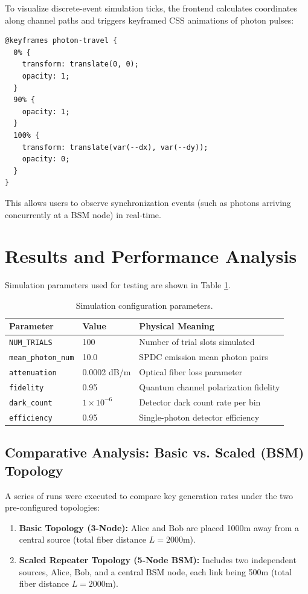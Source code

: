 \documentclass[12pt,oneside,letterpaper,english]{article}
\begin{document}
To visualize discrete-event simulation ticks, the frontend calculates coordinates along channel paths and triggers keyframed CSS animations of photon pulses:
\begin{lstlisting}[language=HTML, caption={CSS keyframe photon animation}, label={lst:css_anim}]
@keyframes photon-travel {
  0% {
    transform: translate(0, 0);
    opacity: 1;
  }
  90% {
    opacity: 1;
  }
  100% {
    transform: translate(var(--dx), var(--dy));
    opacity: 0;
  }
}
\end{lstlisting}
This allows users to observe synchronization events (such as photons arriving concurrently at a BSM node) in real-time.

\section{Results and Performance Analysis}

Simulation parameters used for testing are shown in Table \ref{tab:sim_params}.

\begin{table}[H]
\centering
\caption{Simulation configuration parameters.}
\label{tab:sim_params}
\begin{tabular}{lll}
\toprule
\textbf{Parameter} & \textbf{Value} & \textbf{Physical Meaning} \\
\midrule
\texttt{NUM\_TRIALS} & 100 & Number of trial slots simulated \\
\texttt{mean\_photon\_num} & 10.0 & SPDC emission mean photon pairs \\
\texttt{attenuation} & 0.0002 dB/m & Optical fiber loss parameter \\
\texttt{fidelity} & 0.95 & Quantum channel polarization fidelity \\
\texttt{dark\_count} & $1 \times 10^{-6}$ & Detector dark count rate per bin \\
\texttt{efficiency} & 0.95 & Single-photon detector efficiency \\
\bottomrule
\end{tabular}
\end{table}

\subsection{Comparative Analysis: Basic vs. Scaled (BSM) Topology}

A series of runs were executed to compare key generation rates under the two pre-configured topologies:
\begin{enumerate}
    \item \textbf{Basic Topology (3-Node):} Alice and Bob are placed 1000m away from a central source (total fiber distance $L = 2000$m).
    \item \textbf{Scaled Repeater Topology (5-Node BSM):} Includes two independent sources, Alice, Bob, and a central BSM node, each link being 500m (total fiber distance $L = 2000$m).
\end{enumerate}
\end{document}
